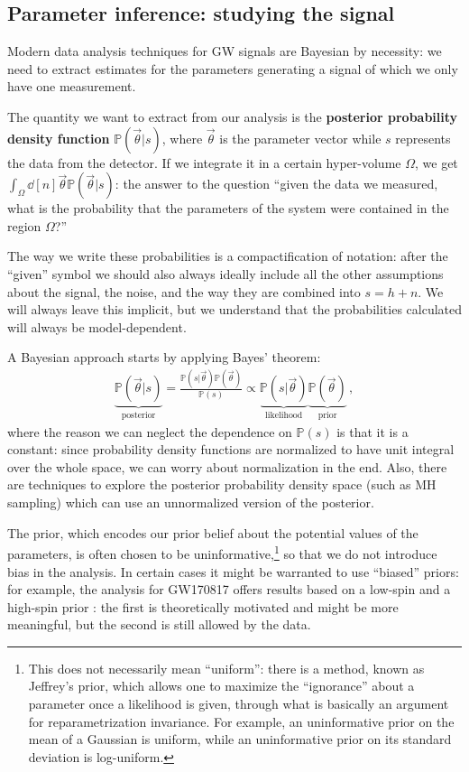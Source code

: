 \documentclass[main.tex]{subfiles}
\begin{document}
\subsection{Parameter inference: studying the signal}

Modern data analysis techniques for \ac{GW} signals are Bayesian by necessity: we need to extract estimates for the parameters generating a signal of which we only have one measurement. 

The quantity we want to extract from our analysis is the \textbf{posterior probability density function} \(\mathbb{P}(\vec{\theta} | s)\), where \(\vec{\theta}\) is the parameter vector while \(s\) represents the data from the detector. 
If we integrate it in a certain hyper-volume \(\Omega \), we get \(\int_{\Omega } \dd[n]{\vec{\theta}} \mathbb{P}(\vec{\theta} | s)\): the answer to the question ``given the data we measured, what is the probability that the parameters of the system were contained in the region \(\Omega \)?''

The way we write these probabilities is a compactification of notation: 
after the ``given'' symbol we should also always ideally include all the other assumptions about the signal, the noise, and the way they are combined into \(s = h + n\). We will always leave this implicit, but we understand that the probabilities calculated will always be model-dependent. 

A Bayesian approach starts by applying Bayes' theorem: 
%
\begin{align}
\underbrace{\mathbb{P}(\vec{\theta}| s )}_{\text{posterior}} = \frac{\mathbb{P}(s | \vec{\theta}) \mathbb{P}(\vec{\theta})}{\mathbb{P}(s)}
\propto \underbrace{\mathbb{P}(s | \vec{\theta})}_{\text{likelihood}} \underbrace{\mathbb{P}(\vec{\theta})}_{\text{prior}}
\,,
\end{align}
%
where the reason we can neglect the dependence on \(\mathbb{P}(s)\) is that it is a constant: since probability density functions are normalized to have unit integral over the whole space, we can worry about normalization in the end. 
Also, there are techniques to explore the posterior probability density space (such as \ac{MH} sampling) which can use an unnormalized version of the posterior.

The prior, which encodes our prior belief about the potential values of the parameters, is often chosen to be uninformative,\footnote{This does not necessarily mean ``uniform'': there is a method, known as Jeffrey's prior, which allows one to maximize the ``ignorance'' about a parameter once a likelihood is given, through what is basically an argument for reparametrization invariance. For example, an uninformative prior on the mean of a Gaussian is uniform, while an uninformative prior on its standard deviation is log-uniform.} so that we do not introduce bias in the analysis. 
In certain cases it might be warranted to use ``biased'' priors: for example, the analysis for GW170817 offers results based on a low-spin and a high-spin prior \cite{abbottGW170817ObservationGravitational2017}: the first is theoretically motivated and might be more meaningful, but the second is still allowed by the data. 
\end{document}
